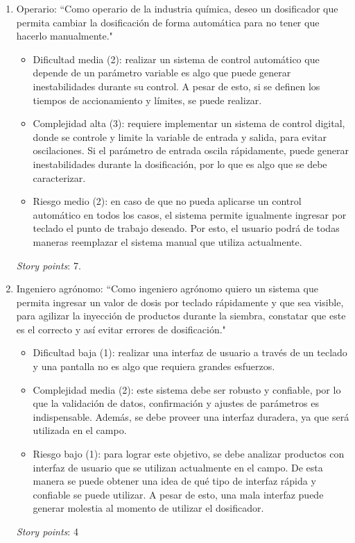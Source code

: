 \documentclass[
11pt, %
]{charter}
\begin{document}
\begin{enumerate}
\item Operario: ``Como operario de la industria química, deseo un dosificador que permita cambiar la dosificación de forma automática para no tener que hacerlo manualmente."

\begin{itemize}
	\item Dificultad media (2): realizar un sistema de control automático que depende de un parámetro variable es algo que puede generar inestabilidades durante su control. A pesar de esto, si se definen los tiempos de accionamiento y límites, se puede realizar.
	\item Complejidad alta (3): requiere implementar un sistema de control digital, donde se controle y limite la variable de entrada y salida, para evitar oscilaciones. Si el parámetro de entrada oscila rápidamente, puede generar inestabilidades durante la dosificación, por lo que es algo que se debe caracterizar.
	\item Riesgo medio (2): en caso de que no pueda aplicarse un control automático en todos los casos, el sistema permite igualmente ingresar por teclado el punto de trabajo deseado. Por esto, el usuario podrá de todas maneras reemplazar el sistema manual que utiliza actualmente.
\end{itemize}

\textit{Story points}: 7.

\item Ingeniero agrónomo: ``Como ingeniero agrónomo quiero un sistema que permita ingresar un valor de dosis por teclado rápidamente y que sea visible, para agilizar la inyección de productos durante la siembra, constatar que este es el correcto y así evitar errores de dosificación."

\begin{itemize}
	\item Dificultad baja (1): realizar una interfaz de usuario a través de un teclado y una pantalla no es algo que requiera grandes esfuerzos.
	\item Complejidad media (2): este sistema debe ser robusto y confiable, por lo que la validación de datos, confirmación y ajustes de parámetros es indispensable. Además, se debe proveer una interfaz duradera, ya que será utilizada en el campo.
	\item Riesgo bajo (1): para lograr este objetivo, se debe analizar productos con interfaz de usuario que se utilizan actualmente en el campo. De esta manera se puede obtener una idea de qué tipo de interfaz rápida y confiable se puede utilizar. A pesar de esto, una mala interfaz puede generar molestia al momento de utilizar el dosificador.
\end{itemize}

\textit{Story points}: 4


\end{enumerate}
\end{document}
